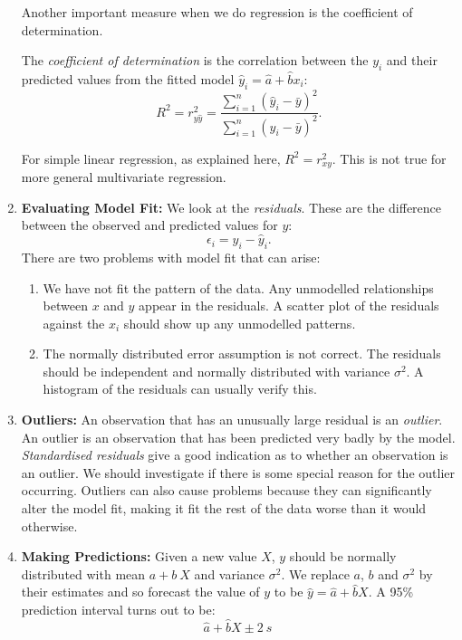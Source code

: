 \documentclass[a4paper,11pt,oneside,onecolumn]{book}
\begin{document}
\begin{enumerate}
\vspace{.5cm}

Another important measure when we do regression is the coefficient of determination.

\begin{definition}

The {\it coefficient of determination} is the correlation between the $y_i$ and
their predicted values from the fitted model $\hat{y}_i =
\hat{a} + \hat{b} x_i$:
\[ R^2 = r^2_{y \hat{y}} = \frac{\sum_{i=1}^n (\hat{y}_i -
\bar{y})^2}{\sum_{i=1}^n(y_i - \bar{y})^2}. \] 
\end{definition}
For simple linear
regression, as explained here, $R^2 = r^2_{xy}$. This is not true
for more general multivariate regression.

\item {\bf Evaluating Model Fit:} We look at the {\it residuals}. These
are the difference between the observed and predicted values for
$y$:
\[ \epsilon_i = y_i - \hat{y}_i.
\]  There are two problems with model fit
that can arise: 
\begin{enumerate} 
\item We have not fit the pattern
of the data.  Any unmodelled relationships between $x$ and $y$
appear in the residuals. A scatter plot of the residuals against the
$x_i$ should show up any unmodelled patterns. 
\item The normally
distributed error assumption is not correct. The residuals should be
independent and normally distributed with variance $\sigma^2$. A
histogram of the residuals can usually verify this.
\end{enumerate}

\item {\bf Outliers:} An observation that has an unusually large
residual is an {\it outlier}. An outlier is an observation that
has been predicted very badly by the model. {\it Standardised
residuals} give a good indication as to whether an observation is
an outlier. We should investigate if there is some special reason
for the outlier occurring. Outliers can also cause problems
because they can significantly alter the model fit, making it fit
the rest of the data worse than it would otherwise.

\item {\bf Making Predictions:} Given a new value $X$, $y$ should be
normally distributed with mean $a + b\  X$ and variance
$\sigma^2$. We replace $a$, $b$ and $\sigma^2$ by their
estimates and so forecast the value of $y$ to be $\hat{y} =
\hat{a} + \hat{b}X$. A 95\% prediction interval turns out
to be:
$$
\hat{a} + \hat{b}X \pm 2 \ s \
$$


\end{enumerate}
\end{document}
